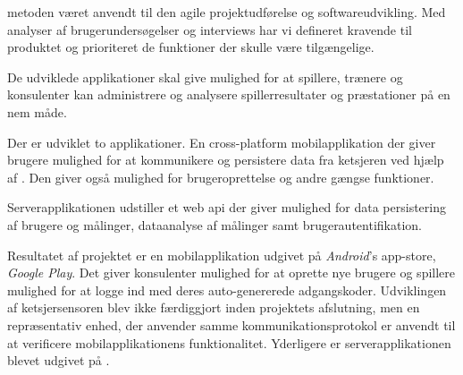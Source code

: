  metoden været anvendt til den agile projektudførelse og softwareudvikling.
Med analyser af brugerundersøgelser og interviews har vi defineret kravende til produktet og prioriteret de funktioner der skulle være tilgængelige.

De udviklede applikationer skal give mulighed for at spillere, trænere og konsulenter kan administrere og analysere spillerresultater og præstationer på en nem måde.

Der er udviklet to applikationer.
En cross-platform mobilapplikation der giver brugere mulighed for at kommunikere og persistere data fra ketsjeren ved hjælp af .
Den giver også mulighed for brugeroprettelse og andre gængse funktioner.

Serverapplikationen udstiller et web \gls{api} der giver mulighed for data persistering af brugere og målinger, dataanalyse af målinger samt brugerautentifikation.

Resultatet af projektet er en mobilapplikation udgivet på \textit{Android}'s app-store, \textit{Google Play}.
Det giver konsulenter mulighed for at oprette nye brugere og spillere mulighed for at logge ind med deres auto-genererede adgangskoder.
Udviklingen af ketsjersensoren blev ikke færdiggjort inden projektets afslutning, men en repræsentativ enhed, der anvender samme kommunikationsprotokol er anvendt til at verificere mobilapplikationens funktionalitet.
Yderligere er serverapplikationen blevet udgivet på .
